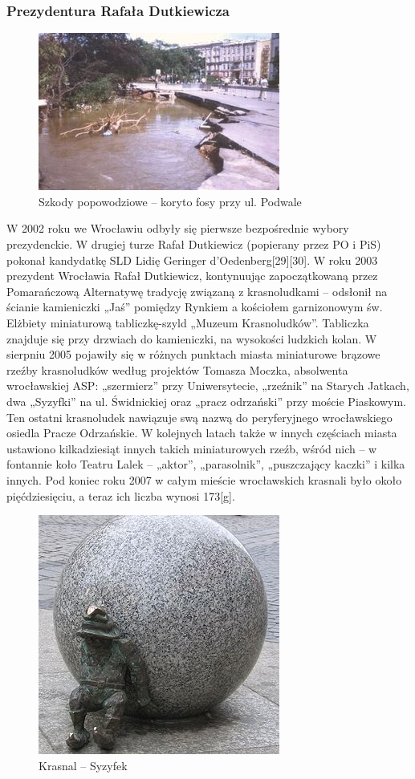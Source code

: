 \documentclass{article}
\begin{document}
\subsubsection{Prezydentura Rafała Dutkiewicza}
\begin{figure}[h]
\centering
\includegraphics[scale=2.5]{21.jpg}
\caption{Szkody popowodziowe – koryto fosy przy ul. Podwale}
\end{figure}
\bigskip
\newline
W 2002 roku we Wrocławiu odbyły się pierwsze bezpośrednie wybory prezydenckie. W drugiej turze Rafał Dutkiewicz (popierany przez PO i PiS) pokonał kandydatkę SLD Lidię Geringer d’Oedenberg[29][30].
\bigskip
\newline
W roku 2003 prezydent Wrocławia Rafał Dutkiewicz, kontynuując zapoczątkowaną przez Pomarańczową Alternatywę tradycję związaną z krasnoludkami – odsłonił na ścianie kamieniczki „Jaś” pomiędzy Rynkiem a kościołem garnizonowym św. Elżbiety miniaturową tabliczkę-szyld „Muzeum Krasnoludków”. Tabliczka znajduje się przy drzwiach do kamieniczki, na wysokości ludzkich kolan. W sierpniu 2005 pojawiły się w różnych punktach miasta miniaturowe brązowe rzeźby krasnoludków według projektów Tomasza Moczka, absolwenta wrocławskiej ASP: „szermierz” przy Uniwersytecie, „rzeźnik” na Starych Jatkach, dwa „Syzyfki” na ul. Świdnickiej oraz „pracz odrzański” przy moście Piaskowym. Ten ostatni krasnoludek nawiązuje swą nazwą do peryferyjnego wrocławskiego osiedla Pracze Odrzańskie. W kolejnych latach także w innych częściach miasta ustawiono kilkadziesiąt innych takich miniaturowych rzeźb, wśród nich – w fontannie koło Teatru Lalek – „aktor”, „parasolnik”, „puszczający kaczki” i kilka innych. Pod koniec roku 2007 w całym mieście wrocławskich krasnali było około pięćdziesięciu, a teraz ich liczba wynosi 173[g].
\bigskip
\newline
\begin{figure}[h]
\centering
\includegraphics[scale=0.7]{22.jpg}
\caption{Krasnal – Syzyfek}
\end{figure}
\end{document}
